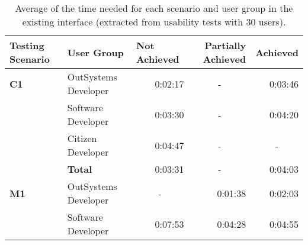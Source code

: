 \begin{table}[tb]
    \caption{Average of the time needed for each scenario and user group in the existing interface (extracted from usability tests with 30 users).}
      \label{tab:duration_existing_interface}
    \begin{tabular}{llrrr}
    \hline
    \rowcolor[HTML]{EFEFEF} 
    \textbf{Testing Scenario} & \textbf{User Group}  & \multicolumn{1}{l}{\cellcolor[HTML]{EFEFEF}\textbf{Not Achieved}} & \multicolumn{1}{C{2cm}}{\cellcolor[HTML]{EFEFEF}\textbf{Partially Achieved}} & \multicolumn{1}{l}{\cellcolor[HTML]{EFEFEF}\textbf{Achieved}} \\ \hline
    \textbf{C1}               & OutSystems Developer & 0:02:17                                                           & \multicolumn{1}{c}{-}                                                   & 0:03:46                                                       \\
                              & Software Developer   & 0:03:30                                                           & \multicolumn{1}{c}{-}                                                   & 0:04:20                                                       \\
                              & Citizen Developer    & 0:04:47                                                           & \multicolumn{1}{c}{-}                                                   & \multicolumn{1}{c}{-}                                         \\
                              & \textbf{Total}       & 0:03:31                                                           & \multicolumn{1}{c}{-}                                                   & 0:04:03                                                       \\ \hline
    \textbf{M1}               & OutSystems Developer & \multicolumn{1}{c}{-}                                             & 0:01:38                                                                 & 0:02:03                                                       \\
                              & Software Developer   & 0:07:53                                                           & 0:04:28                                                                 & 0:04:55                                                       \\

\end{tabular}
\end{table}
